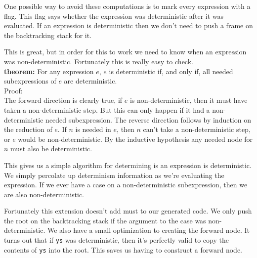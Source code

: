 \documentclass{article}
\begin{document}
One possible way to avoid these computations is to mark every expression with a flag.
This flag says whether the expression was deterministic after it was evaluated.
If an expression is deterministic then we don't need to push a frame on the backtracking stack for it.

This is great, but in order for this to work we need to know when an expression was non-deterministic.
Fortunately this is really easy to check.\\
$\ $\\
\textbf{theorem:}
For any expression $e$, $e$ is deterministic if, and only if, all needed subexpressions of $e$ are deterministic.\\
$\ $\\
Proof:\\
The forward direction is clearly true, if $e$ is non-deterministic, then it must have taken a non-deterministic step.
But this can only happen if it had a non-deterministic needed subexpression.
The reverse direction follows by induction on the reduction of $e$.
If $n$ is needed in $e$, then $n$ can't take a non-deterministic step, or $e$ would be non-deterministic.
By the inductive hypothesis any needed node for $n$ must also be deterministic.

This gives us a simple algorithm for determining is an expression is deterministic.
We simply percolate up determinism information as we're evaluating the expression.
If we ever have a case on a non-deterministic subexpression, then we are also non-deterministic.

Fortunately this extension doesn't add must to our generated code.
We only push the root on the backtracking stack if the argument to the case was non-deterministic.
We also have a small optimization to creating the forward node.
It turns out that if \texttt{ys} was deterministic, then it's perfectly valid to copy the
contents of \texttt{ys} into the root.
This saves us having to construct a forward node.
\end{document}
